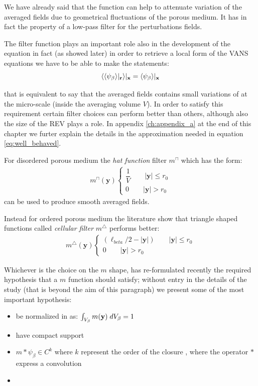 We have already said that the function can help to attenuate variation of the averaged fields due to geometrical fluctuations of the porous medium.
It has in fact the property of a low-pass filter for the perturbations fields.


The filter function plays an important role also in the development of the equation in fact (as showed later) in order to retrieve a local form of the VANS equations we have to be able to make the statements:
\begin{equation}
{\left< {\left< \psi_{\beta} \right>}|_{\mathbf{r}} \right>}|_{\mathbf{x}} = {\left< \psi_{\beta} \right>}|_{\mathbf{x}}
\label{eq:well_behaved}
\end{equation}

that is equivalent to say that the averaged fields contains small variations of at the micro-scale (inside the averaging volume $V$).
In order to satisfy this requirement certain filter choices can perform better than others, although also the size of the REV plays a role.
In appendix \ref{ch:appendix_a} at the end of this chapter we furter explain the details in the approximation needed in equation \ref{eq:well_behaved}.

For disordered porous medium the \textit{hat function} filter $m^{\sqcap}$ which has the form:
\begin{eqnarray}
	m^{\sqcap}(\mathbf{y}) 
	\begin{cases}
		\dfrac{1}{V} \qquad |\mathbf{y}| \leqslant r_0\\
		0 \qquad |\mathbf{y}|> r_0
	\end{cases}
\end{eqnarray}
can be used to produce smooth averaged fields.

Instead for ordered porous medium the literature show that triangle shaped functions called \textit{cellular filter}  $m^{\bigtriangleup}$  performs better:
\begin{eqnarray}
m^{\bigtriangleup}(\mathbf{y}) 
\begin{cases}
(\ell_{beta}/2 - |\mathbf{y}|) \qquad |\mathbf{y}| \leqslant r_0\\
0 \qquad |\mathbf{y}|> r_0
\end{cases}
\end{eqnarray}

Whichever is the choice on the $m$ shape, \citet{davit2017technical} has re-formulated recently the required hypothesis that a $m$ function should satisfy; without entry in the details of the study (that is beyond the aim of this paragraph) we present some of the most important hypothesis:
\begin{itemize}
	\item be normalized in as: $\int_{V_\beta}  m(\mathbf{y}) \; dV_\beta = 1$
	\item have compact support 
	\item $m*\psi_{\beta} \in C^{k}$ where $k$ represent the order of the closure , where the operator $*$ express a convolution
	\item 
\end{itemize}


